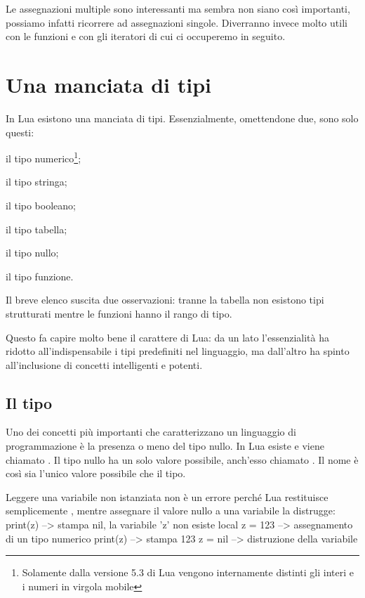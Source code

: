 Le assegnazioni multiple sono interessanti ma sembra non siano così importanti,
possiamo infatti ricorrere ad assegnazioni singole. Diverranno invece molto
utili con le funzioni e con gli iteratori di cui ci occuperemo in seguito.


\section{Una manciata di tipi}
\label{secFondManciataTipi}

In Lua esistono una manciata di tipi. Essenzialmente, omettendone due, sono solo
questi:
\begin{compactitemize}
\item {} il tipo numerico\footnote{Solamente dalla versione 5.3 di Lua
vengono internamente distinti gli interi e i numeri in virgola mobile};
\item {} il tipo stringa;
\item {} il tipo booleano;
\item {} il tipo tabella;
\item {} il tipo nullo;
\item {} il tipo funzione.
\end{compactitemize}

Il breve elenco suscita due osservazioni: tranne la tabella non esistono
tipi strutturati mentre le funzioni hanno il rango di tipo.

Questo fa capire molto bene il carattere di Lua: da un lato l'essenzialità ha
ridotto all'indispensabile i tipi predefiniti nel linguaggio, ma dall'altro ha
spinto all'inclusione di concetti intelligenti e potenti.


\subsection{Il tipo }

Uno dei concetti più importanti che caratterizzano un linguaggio di
programmazione è la presenza o meno del tipo nullo. In Lua esiste e viene
chiamato . Il tipo nullo ha un solo valore possibile, anch'esso
chiamato . Il nome è così sia l'unico valore possibile che il tipo.

Leggere una variabile non istanziata non è un errore perché Lua restituisce
semplicemente , mentre assegnare il valore nullo a una variabile la
distrugge:
\lines
print(z)      --> stampa nil, la variabile 'z' non esiste
local z = 123 --> assegnamento di un tipo numerico
print(z)      --> stampa 123
z = nil       --> distruzione della variabile
\endlines
{}


